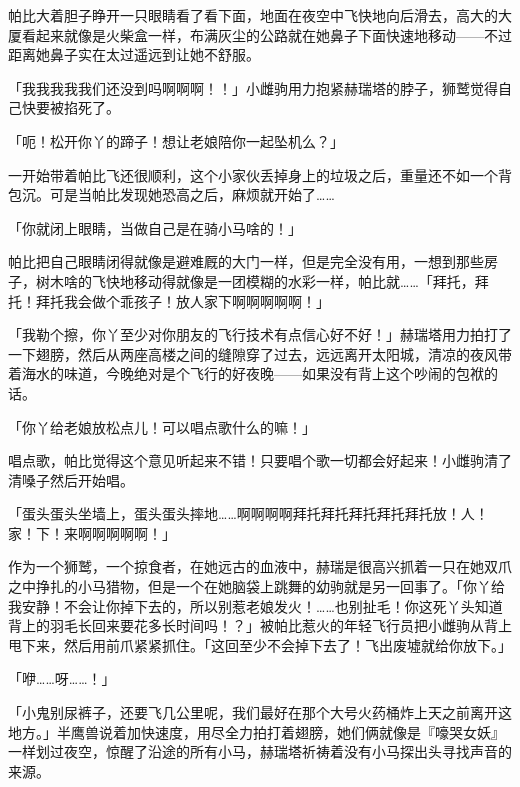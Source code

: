 \horizonline


帕比大着胆子睁开一只眼睛看了看下面，地面在夜空中飞快地向后滑去，高大的大厦看起来就像是火柴盒一样，布满灰尘的公路就在她鼻子下面快速地移动——不过距离她鼻子实在太过遥远到让她不舒服。

「我我我我我们还没到吗啊啊啊！！」小雌驹用力抱紧赫瑞塔的脖子，狮鹫觉得自己快要被掐死了。

「呃！松开你丫的蹄子！想让老娘陪你一起坠机么？」

一开始带着帕比飞还很顺利，这个小家伙丢掉身上的垃圾之后，重量还不如一个背包沉。可是当帕比发现她恐高之后，麻烦就开始了……{}

「你就闭上眼睛，当做自己是在骑小马啥的！」

帕比把自己眼睛闭得就像是避难厩的大门一样，但是完全没有用，一想到那些房子，树木啥的飞快地移动得就像是一团模糊的水彩一样，帕比就……「拜托，拜托！拜托我会做个乖孩子！放人家下啊啊啊啊啊！」

「我勒个擦，你丫至少对你朋友的飞行技术有点信心好不好！」赫瑞塔用力拍打了一下翅膀，然后从两座高楼之间的缝隙穿了过去，远远离开太阳城，清凉的夜风带着海水的味道，今晚绝对是个飞行的好夜晚——如果没有背上这个吵闹的包袱的话。

「你丫给老娘放松点儿！可以唱点歌什么的嘛！」

唱点歌，帕比觉得这个意见听起来不错！只要唱个歌一切都会好起来！小雌驹清了清嗓子然后开始唱。

「蛋头蛋头坐墙上，蛋头蛋头摔地……啊啊啊啊拜托拜托拜托拜托拜托放！人！家！下！来啊啊啊啊啊！」

作为一个狮鹫，一个掠食者，在她远古的血液中，赫瑞是很高兴抓着一只在她双爪之中挣扎的小马猎物，但是一个在她脑袋上跳舞的幼驹就是另一回事了。「你丫给我安静！不会让你掉下去的，所以别惹老娘发火！……也别扯毛！你这死丫头知道背上的羽毛长回来要花多长时间吗！？」被帕比惹火的年轻飞行员把小雌驹从背上甩下来，然后用前爪紧紧抓住。「这回至少不会掉下去了！飞出废墟就给你放下。」

「咿……呀……！」

「小鬼别尿裤子，还要飞几公里呢，我们最好在那个大号火药桶炸上天之前离开这地方。」半鹰兽说着加快速度，用尽全力拍打着翅膀，她们俩就像是『嚎哭女妖』一样划过夜空，惊醒了沿途的所有小马，赫瑞塔祈祷着没有小马探出头寻找声音的来源。

\horizonline


